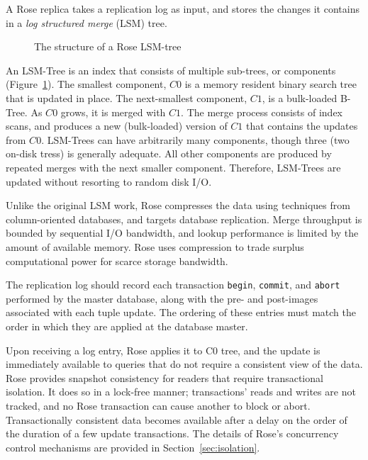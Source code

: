 \documentclass{vldb}
\newcommand{\rows}{Rose\xspace}
\newcommand{\rowss}{Rose's\xspace}
\begin{document}
A \rows replica takes a replication log as input, and stores the
changes it contains in a {\em log structured merge} (LSM)
tree\cite{lsm}.
\begin{figure}
\centering {}
\caption{The structure of a \rows LSM-tree}
\label{fig:lsm-tree}
\end{figure}
An LSM-Tree is an index that consists of multiple sub-trees, or
components (Figure~\ref{fig:lsm-tree}).  The smallest component, $C0$ is a memory resident
binary search tree that is updated in place.  The next-smallest component, $C1$, is a bulk-loaded B-Tree.  As $C0$ grows,
it is merged with $C1$.  The merge process consists of index scans,
and produces a new (bulk-loaded) version of $C1$ that contains the
updates from $C0$.  LSM-Trees can have arbitrarily many components,
though three (two on-disk tress) is generally adequate.
All other
components are produced by repeated merges with the next smaller
component.  Therefore, LSM-Trees are updated without resorting to
random disk I/O.

Unlike the original LSM work, \rows compresses the data using
techniques from column-oriented databases, and targets database
replication.  Merge throughput is bounded by sequential
I/O bandwidth, and lookup performance is limited by the amount of
available memory.  \rows uses compression to trade surplus
computational power for scarce storage bandwidth.

The replication log should record each transaction {\tt begin}, {\tt commit}, and
{\tt abort} performed by the master database, along with the pre- and
post-images associated with each tuple update.  The ordering of these
entries must match the order in which they are applied at the
database master.

Upon receiving a log entry, \rows applies it to C0 tree, and
the update is immediately available to queries that do not require a
consistent view of the data.  \rows provides snapshot consistency for
readers that require transactional isolation.  It does so in a
lock-free manner; transactions' reads and writes are not tracked, and
no \rows transaction can cause another to block or abort.  
Transactionally consistent data becomes available after
a delay on the order of the duration of a few update transactions.
The details of \rowss concurrency control mechanisms are provided in
Section~\ref{sec:isolation}.

\end{document}
